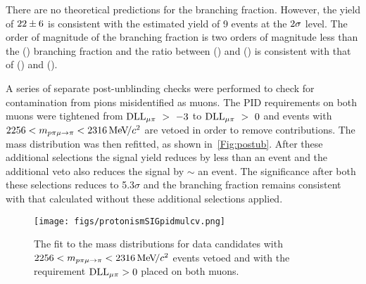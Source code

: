 There are no theoretical predictions for the \Lbpi branching fraction. However, the yield of $22\pm6$ is consistent with the estimated yield of 9 events at the $2\sigma$ level. The order of magnitude of the \Lbpi branching fraction is two orders of magnitude less than the \Lb\to\proton\pim\jpsi(\to\mumu) branching fraction and the ratio between \BF(\Lbpi) and \BF(\Lbpijpsi) is consistent with that of \BF(\LbL) and \BF(\Lb\to\Lz\jpsi).

A series of separate post-unblinding checks were performed to check for contamination from pions misidentified as muons. The PID requirements on both muons were tightened from $\mathrm{DLL}_{{\mu}\pi}~>~-3$ to $\mathrm{DLL}_{{\mu}\pi}~>~0$ and events with $2256<m_{p\pi\mu\rightarrow\pi}<2316{\mathrm{\,Me\kern -0.1em V\!/}c^2}$ are vetoed in order to remove \Lc contributions. The \Lbpi mass distribution was then refitted, as shown in~\autoref{Fig:postub}. After these additional \dllmupi selections the signal yield reduces by less than an event and the additional \Lc veto also reduces the signal by $\sim$ an event.  The significance after both these selections reduces to 5.3$\sigma$ and the branching fraction remains consistent with that calculated without these additional selections applied.

\begin{figure}[h!]
  \def\nh{0.7\textwidth}
  \centering
  \texttt{[image: figs/protonismSIGpidmulcv.png]}%
  \caption{The fit to the \Lbpi mass distributions for data candidates with $2256<m_{p\pi\mu\rightarrow\pi}<2316{\mathrm{\,Me\kern -0.1em V\!/}c^2}$ events vetoed and with the requirement $\mathrm{DLL}_{{\mu}\pi}>0$ placed on both muons.}
  \label{Fig:postub}
\end{figure}






